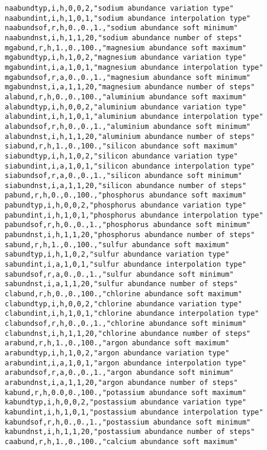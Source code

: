 \begin{verbatim}
naabundtyp,i,h,0,0,2,"sodium abundance variation type"
naabundint,i,h,1,0,1,"sodium abundance interpolation type"
naabundsof,r,h,0.,0.,1.,"sodium abundance soft minimum"
naabundnst,i,h,1,1,20,"sodium abundance number of steps"
mgabund,r,h,1.,0.,100.,"magnesium abundance soft maximum"
mgabundtyp,i,h,1,0,2,"magnesium abundance variation type"
mgabundint,i,a,1,0,1,"magnesium abundance interpolation type"
mgabundsof,r,a,0.,0.,1.,"magnesium abundance soft minimum"
mgabundnst,i,a,1,1,20,"magnesium abundance number of steps"
alabund,r,h,0.,0.,100.,"aluminium abundance soft maximum"
alabundtyp,i,h,0,0,2,"aluminium abundance variation type"
alabundint,i,h,1,0,1,"aluminium abundance interpolation type"
alabundsof,r,h,0.,0.,1.,"aluminium abundance soft minimum"
alabundnst,i,h,1,1,20,"aluminium abundance number of steps"
siabund,r,h,1.,0.,100.,"silicon abundance soft maximum"
siabundtyp,i,h,1,0,2,"silicon abundance variation type"
siabundint,i,a,1,0,1,"silicon abundance interpolation type"
siabundsof,r,a,0.,0.,1.,"silicon abundance soft minimum"
siabundnst,i,a,1,1,20,"silicon abundance number of steps"
pabund,r,h,0.,0.,100.,"phosphorus abundance soft maximum"
pabundtyp,i,h,0,0,2,"phosphorus abundance variation type"
pabundint,i,h,1,0,1,"phosphorus abundance interpolation type"
pabundsof,r,h,0.,0.,1.,"phosphorus abundance soft minimum"
pabundnst,i,h,1,1,20,"phosphorus abundance number of steps"
sabund,r,h,1.,0.,100.,"sulfur abundance soft maximum"
sabundtyp,i,h,1,0,2,"sulfur abundance variation type"
sabundint,i,a,1,0,1,"sulfur abundance interpolation type"
sabundsof,r,a,0.,0.,1.,"sulfur abundance soft minimum"
sabundnst,i,a,1,1,20,"sulfur abundance number of steps"
clabund,r,h,0.,0.,100.,"chlorine abundance soft maximum"
clabundtyp,i,h,0,0,2,"chlorine abundance variation type"
clabundint,i,h,1,0,1,"chlorine abundance interpolation type"
clabundsof,r,h,0.,0.,1.,"chlorine abundance soft minimum"
clabundnst,i,h,1,1,20,"chlorine abundance number of steps"
arabund,r,h,1.,0.,100.,"argon abundance soft maximum"
arabundtyp,i,h,1,0,2,"argon abundance variation type"
arabundint,i,a,1,0,1,"argon abundance interpolation type"
arabundsof,r,a,0.,0.,1.,"argon abundance soft minimum"
arabundnst,i,a,1,1,20,"argon abundance number of steps"
kabund,r,h,0.0,0.,100.,"potassium abundance soft maximum"
kabundtyp,i,h,0,0,2,"postassium abundance variation type"
kabundint,i,h,1,0,1,"postassium abundance interpolation type"
kabundsof,r,h,0.,0.,1.,"postassium abundance soft minimum"
kabundnst,i,h,1,1,20,"postassium abundance number of steps"
caabund,r,h,1.,0.,100.,"calcium abundance soft maximum"

\end{verbatim}
